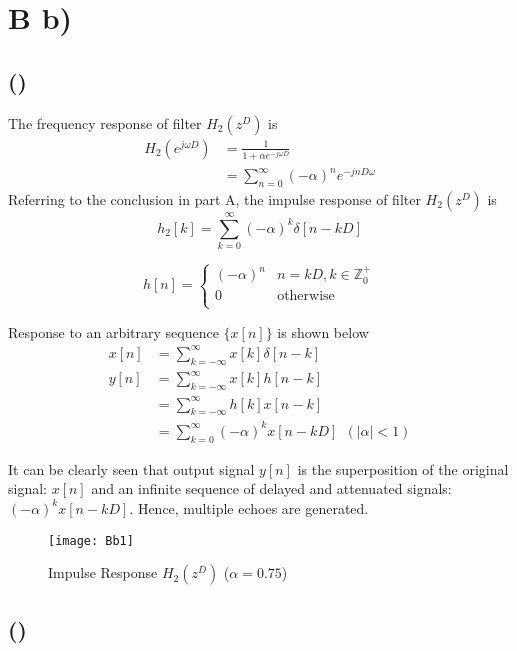 \documentclass{article}
\newenvironment{homeworkProblem}[1]{
	\section*{#1}
	}{
}
\newenvironment{homeworkSection}[1]{
	\subsection*{#1}
	}{
}
\begin{document}
\begin{homeworkProblem}{B b)}

\begin{homeworkSection}{()}

The frequency response of filter $H_2(z^D)$ is 
\begin{align*}
H_2(e^{j\omega D}) &= \frac{1}{1 + \alpha e^{-j\omega D}}\\
&= \sum_{n=0}^{\infty} (-\alpha)^n e^{-jnD\omega}
\end{align*}
Referring to the conclusion in part A, the impulse response of filter $H_2(z^D)$ is
\begin{equation}
h_2[k]=\sum_{k=0}^{\infty}(-\alpha)^k\delta[n-kD]
\end{equation}

\begin{equation}\label{B2i1}
h[n] =
\begin{cases} (-\alpha)^n & n=kD, k \in \mathbb{Z}_0^{+}\\ 0 & \text{otherwise}\\ \end{cases}
\end{equation}

Response to an arbitrary sequence $\{x[n]\}$ is shown below
\begin{align*}
x[n] &= \sum_{k=-\infty}^{\infty} x[k] \delta[n-k]\\
y[n] &= \sum_{k=-\infty}^{\infty} x[k] h[n-k]\\
&= \sum_{k=-\infty}^{\infty} h[k] x[n-k]\\
&= \sum_{k=0}^{\infty} (-\alpha)^k x[n-kD]\ \ (|\alpha| < 1)
\end{align*}

It can be clearly seen that output signal $y[n]$ is the superposition of the original signal: $x[n]$ and an infinite sequence of delayed and attenuated signals: $(-\alpha)^k x[n-kD]$. Hence, multiple echoes are generated.

\begin{figure}[H]
\centering
\texttt{[image: Bb1]}
\caption{Impulse Response $H_2(z^D)$ ($\alpha=0.75$)}
\label{Bb1}
\end{figure}

\end{homeworkSection}


\begin{homeworkSection}{()}


\end{homeworkSection}
\end{homeworkProblem}
\end{document}
